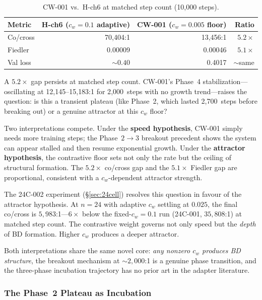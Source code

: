 \begin{table}[h]
\centering
\small
\begin{tabular}{@{}lrrr@{}}
\toprule
Metric & H-ch6 ($c_w = 0.1$ adaptive) & CW-001 ($c_w = 0.005$ floor) & Ratio \\
\midrule
Co/cross & 70{,}404:1 & 13{,}456:1 & $5.2\times$ \\
Fiedler & 0.00009 & 0.00046 & $5.1\times$ \\
Val loss & ${\sim}0.40$ & 0.4017 & ${\sim}$same \\
\bottomrule
\end{tabular}
\caption{CW-001 vs.\ H-ch6 at matched step count (10{,}000 steps).}
\label{tab:cw001-comparison}
\end{table}

A $5.2\times$ gap persists at matched step count. CW-001's Phase~4
stabilization---oscillating at 12{,}145--15{,}183:1 for 2{,}000~steps
with no growth trend---raises the question: is this a transient plateau
(like Phase~2, which lasted 2{,}700~steps before breaking out) or a
genuine attractor at this $c_w$ floor?

Two interpretations compete. Under the \textbf{speed hypothesis}, CW-001
simply needs more training steps; the Phase~$2 \to 3$ breakout precedent
shows the system can appear stalled and then resume exponential growth.
Under the \textbf{attractor hypothesis}, the contrastive floor sets not
only the rate but the ceiling of structural formation. The $5.2\times$
co/cross gap and the $5.1\times$ Fiedler gap are proportional, consistent
with a $c_w$-dependent attractor strength.

The 24C-002 experiment (\S\ref{sec:24cell}) resolves this question in
favour of the attractor hypothesis. At $n{=}24$ with adaptive $c_w$
settling at $0.025$, the final co/cross is $5{,}983$:1---$6\times$ below
the fixed-$c_w{=}0.1$ run (24C-001, $35{,}808$:1) at matched step count.
The contrastive weight governs not only speed but the \emph{depth} of BD
formation. Higher $c_w$ produces a deeper attractor.

Both interpretations share the same novel core: \emph{any nonzero $c_w$
produces BD structure}, the breakout mechanism at ${\sim}2{,}000$:1 is a
genuine phase transition, and the three-phase incubation trajectory
has no prior art in the adapter literature.

\subsubsection{The Phase~2 Plateau as Incubation}

